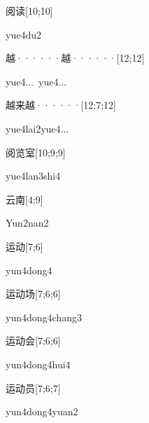 \begin{verbete}[yue4du2]{阅读}[10;10]
\begin{pronuncia}{yue4du2}
\end{pronuncia}
\end{verbete}

\begin{verbete}{越······越······}[12;12]
\begin{pronuncia}[\\]{yue4...\ yue4...}
\end{pronuncia}
\end{verbete}

\begin{verbete}{越来越······}[12;7;12]
\begin{pronuncia}[\\]{yue4lai2yue4...}
\end{pronuncia}
\end{verbete}

\begin{verbete}{阅览室}[10;9;9]
\begin{pronuncia}{yue4lan3shi4}
\end{pronuncia}
\end{verbete}

\begin{verbete}{云南}[4;9]
\begin{pronuncia}{Yun2nan2}
\end{pronuncia}
\end{verbete}

\begin{verbete}{运动}[7;6]
\begin{pronuncia}{yun4dong4}
\end{pronuncia}
\end{verbete}

\begin{verbete}{运动场}[7;6;6]
\begin{pronuncia}[\\]{yun4dong4chang3}
\end{pronuncia}
\end{verbete}

\begin{verbete}{运动会}[7;6;6]
\begin{pronuncia}{yun4dong4hui4}
\end{pronuncia}
\end{verbete}

\begin{verbete}{运动员}[7;6;7]
\begin{pronuncia}[\\]{yun4dong4yuan2}
\end{pronuncia}
\end{verbete}


